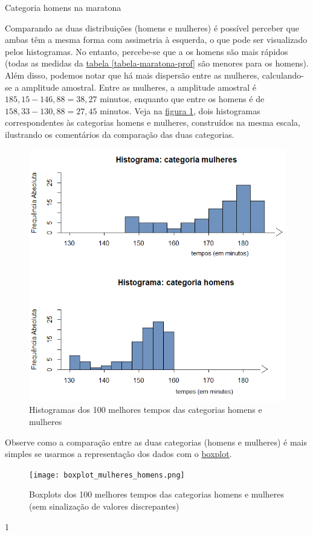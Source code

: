 \begin{answer}{Categoria homens na maratona}
{
Comparando as duas distribuições (homens e mulheres) é possível perceber que ambas têm a mesma forma com assimetria à esquerda, o que pode ser visualizado pelos histogramas. No entanto, percebe-se que a os homens são mais rápidos (todas as medidas da \hyperref[tabela-maratona-prof]{tabela \ref{tabela-maratona-prof}} são menores para os homens). Além disso, podemos notar que há mais dispersão entre as mulheres, calculando-se a amplitude amostral. Entre as mulheres, a amplitude amostral é $185{,}15-146{,}88=38{,}27$ minutos, enquanto que entre os homens é de $158{,}33-130{,}88=27,45$ minutos. Veja na \hyperref[histograma-comparando]{figura \ref{histograma-comparando}}, dois histogramas correspondentes às categorias homens e mulheres, construídos na mesma escala, ilustrando os comentários da comparação das duas categorias.

\begin{figure}[H]
\centering

\includegraphics[width=.6\linewidth]{hist_hxm}
\caption{Histogramas dos 100 melhores tempos das categorias homens e mulheres}
\label{histograma-comparando}
\end{figure}

Observe como a comparação entre as duas categorias (homens e mulheres) é mais simples se usarmos a representação dos dados com o \hyperref[boxplot_mulheres_homens]{boxplot}.

\begin{figure}[H]
\centering

\texttt{[image: boxplot\_mulheres\_homens.png]}
\caption{Boxplots dos 100 melhores tempos das categorias homens e mulheres (sem sinalização de valores discrepantes)}
\label{boxplot_mulheres_homens}
\end{figure}
}{1}
\end{answer}
